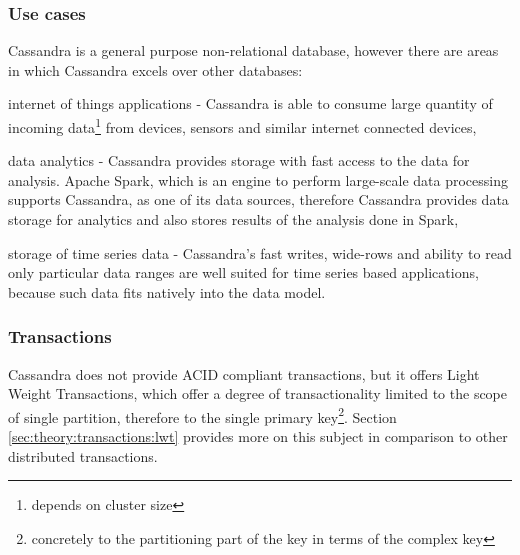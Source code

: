 \subsubsection{Use cases}
Cassandra is a general purpose non-relational database, however there are areas in which Cassandra excels over other databases:
\begin{enumerate*}
\item internet of things applications - Cassandra is able to consume large quantity of incoming data\footnote{depends on cluster size} from devices, sensors and similar internet connected devices,
\item data analytics - Cassandra provides storage with fast access to the data for analysis. Apache Spark, which is an engine to perform large-scale data processing \cite{ApacheSpark} supports Cassandra, as one of its data sources, therefore Cassandra provides data storage for analytics and also stores results of the analysis done in Spark,
\item storage of time series data - Cassandra's fast writes, wide-rows and ability to read only particular data ranges are well suited for time series based applications, because such data fits natively into the data model.
\end{enumerate*} 

\subsubsection{Transactions}
Cassandra does not provide ACID compliant transactions, but it offers Light Weight Transactions, which offer a degree of transactionality limited to the scope of single partition, therefore to the single primary key\footnote{concretely to the partitioning part of the key in terms of the complex key}. Section \ref{sec:theory:transactions:lwt} provides more on this subject in comparison to other distributed transactions. 

